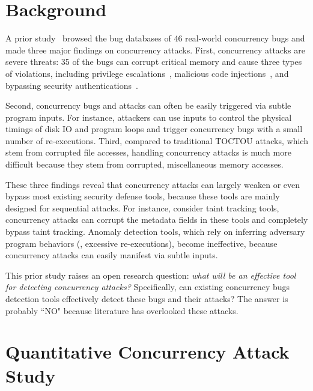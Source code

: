\section{Background}\label{sec:background}

A prior study~\cite{con:hotpar12} browsed the bug databases of 46 real-world 
concurrency bugs and made three major findings on concurrency attacks. First, 
concurrency attacks are severe threats: 35 of the bugs can corrupt critical 
memory and cause three types of violations, including 
privilege escalations~\cite{uselib-bug-12791, mysql-bug-24988}, malicious code 
injections~\cite{berend-jan-wever-msiexploit}, and
bypassing security 
authentications~\cite{xwindows,theotheriphone,theotheriphone-2011}.

Second, concurrency bugs and attacks can often be easily triggered via subtle 
program inputs. For instance, attackers can use inputs to control the physical 
timings of disk IO and program loops and trigger concurrency bugs with a small 
number of re-executions. Third, compared to traditional TOCTOU attacks, which 
stem from corrupted file accesses, handling concurrency attacks is much more 
difficult because they stem from corrupted, miscellaneous memory accesses.

These three findings reveal that concurrency attacks can largely weaken or 
even bypass most existing security defense tools, because these 
tools are mainly designed for sequential attacks. For instance, consider taint 
tracking tools, concurrency attacks can corrupt the metadata fields in these 
tools and completely bypass taint tracking. Anomaly detection tools, which rely 
on inferring adversary program behaviors (\eg, excessive re-executions), 
become ineffective, because concurrency attacks can easily manifest via subtle 
inputs.

This prior study raises an open research question: \emph{what will be an 
effective tool for detecting concurrency attacks?} Specifically, can existing 
concurrency bugs detection tools effectively detect these bugs and their 
attacks? The answer is probably ``NO" because literature has overlooked these 
attacks.


\section{Quantitative Concurrency Attack Study}\label{sec:study}

